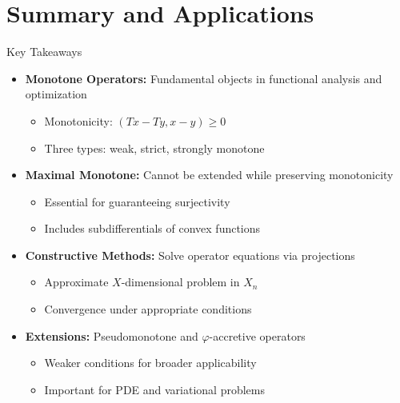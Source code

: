 \documentclass[aspectratio=169,10pt]{beamer}
\begin{document}
\section{Summary and Applications}

\begin{frame}{Key Takeaways}

\begin{itemize}
\item \textbf{Monotone Operators:} Fundamental objects in functional analysis and optimization
  \begin{itemize}
  \item Monotonicity: $(Tx - Ty, x - y) \geq 0$
  \item Three types: weak, strict, strongly monotone
  \end{itemize}

\item \textbf{Maximal Monotone:} Cannot be extended while preserving monotonicity
  \begin{itemize}
  \item Essential for guaranteeing surjectivity
  \item Includes subdifferentials of convex functions
  \end{itemize}

\item \textbf{Constructive Methods:} Solve operator equations via projections
  \begin{itemize}
  \item Approximate $X$-dimensional problem in $X_n$
  \item Convergence under appropriate conditions
  \end{itemize}

\item \textbf{Extensions:} Pseudomonotone and $\varphi$-accretive operators
  \begin{itemize}
  \item Weaker conditions for broader applicability
  \item Important for PDE and variational problems
  \end{itemize}
\end{itemize}

\end{frame}
\end{document}
